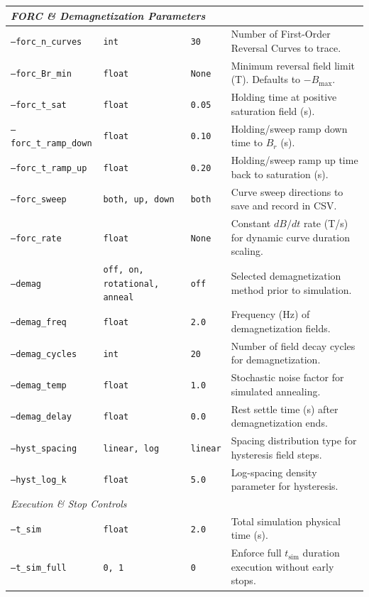 \documentclass[11pt,a4paper]{article}
\newcommand{\code}[1]{\texttt{#1}}
\begin{document}
\begin{longtable}{lp{3.5cm}lp{6.0cm}}
\multicolumn{4}{l}{\textit{FORC \& Demagnetization Parameters}} \\
\midrule
\code{--forc\_n\_curves} & \code{int} & \code{30} & Number of First-Order Reversal Curves to trace. \\
\code{--forc\_Br\_min} & \code{float} & \code{None} & Minimum reversal field limit (\si{T}). Defaults to $-B_{\max}$. \\
\code{--forc\_t\_sat} & \code{float} & \code{0.05} & Holding time at positive saturation field (\si{s}). \\
\code{--forc\_t\_ramp\_down} & \code{float} & \code{0.10} & Holding/sweep ramp down time to $B_r$ (\si{s}). \\
\code{--forc\_t\_ramp\_up} & \code{float} & \code{0.20} & Holding/sweep ramp up time back to saturation (\si{s}). \\
\code{--forc\_sweep} & \code{both, up, down} & \code{both} & Curve sweep directions to save and record in CSV. \\
\code{--forc\_rate} & \code{float} & \code{None} & Constant $dB/dt$ rate (\si{T/s}) for dynamic curve duration scaling. \\
\code{--demag} & \code{off, on, rotational, anneal} & \code{off} & Selected demagnetization method prior to simulation. \\
\code{--demag\_freq} & \code{float} & \code{2.0} & Frequency (\si{Hz}) of demagnetization fields. \\
\code{--demag\_cycles} & \code{int} & \code{20} & Number of field decay cycles for demagnetization. \\
\code{--demag\_temp} & \code{float} & \code{1.0} & Stochastic noise factor for simulated annealing. \\
\code{--demag\_delay} & \code{float} & \code{0.0} & Rest settle time (\si{s}) after demagnetization ends. \\
\code{--hyst\_spacing} & \code{linear, log} & \code{linear} & Spacing distribution type for hysteresis field steps. \\
\code{--hyst\_log\_k} & \code{float} & \code{5.0} & Log-spacing density parameter for hysteresis. \\
\midrule

\multicolumn{4}{l}{\textit{Execution \& Stop Controls}} \\
\midrule
\code{--t\_sim} & \code{float} & \code{2.0} & Total simulation physical time (\si{s}). \\
\code{--t\_sim\_full} & \code{0, 1} & \code{0} & Enforce full $t_{\text{sim}}$ duration execution without early stops. \\
\midrule


\end{longtable}
\end{document}
